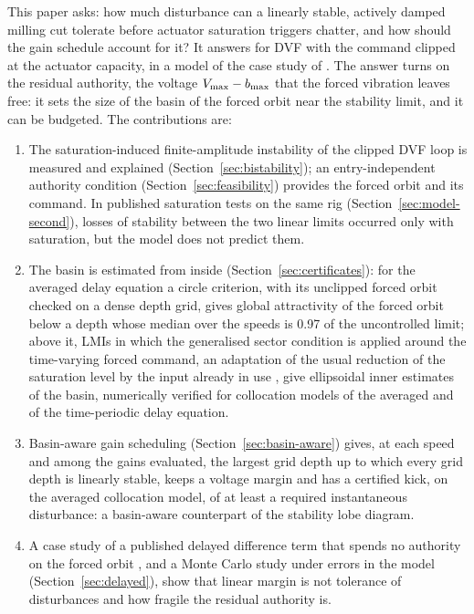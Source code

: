 This paper asks: how much disturbance can a linearly stable, actively damped milling cut tolerate before actuator saturation triggers chatter, and how should the gain schedule account for it? It answers for DVF with the command clipped at the actuator capacity, in a model of the case study of \citet{ozsoy2026robust}. The answer turns on the residual authority, the voltage $V_{\max}-b_{\max}$ that the forced vibration leaves free: it sets the size of the basin of the forced orbit near the stability limit, and it can be budgeted. The contributions are:
\begin{enumerate}
\item The saturation-induced finite-amplitude instability of the clipped DVF loop is measured and explained (Section~\ref{sec:bistability}); an entry-independent authority condition (Section~\ref{sec:feasibility}) provides the forced orbit and its command. In published saturation tests on the same rig (Section~\ref{sec:model-second}), losses of stability between the two linear limits occurred only with saturation, but the model does not predict them.
\item The basin is estimated from inside (Section~\ref{sec:certificates}): for the averaged delay equation a circle criterion, with its unclipped forced orbit checked on a dense depth grid, gives global attractivity of the forced orbit below a depth whose median over the speeds is 0.97 of the uncontrolled limit; above it, LMIs in which the generalised sector condition is applied around the time-varying forced command, an adaptation of the usual reduction of the saturation level by the input already in use \citep{hu2001book,tarbouriech2011book}, give ellipsoidal inner estimates of the basin, numerically verified for collocation models of the averaged and of the time-periodic delay equation.
\item Basin-aware gain scheduling (Section~\ref{sec:basin-aware}) gives, at each speed and among the gains evaluated, the largest grid depth up to which every grid depth is linearly stable, keeps a voltage margin and has a certified kick, on the averaged collocation model, of at least a required instantaneous disturbance: a basin-aware counterpart of the stability lobe diagram.
\item A case study of a published delayed difference term that spends no authority on the forced orbit \citep{pyragas1992continuous,li2022ijamt}, and a Monte Carlo study under errors in the model (Section~\ref{sec:delayed}), show that linear margin is not tolerance of disturbances and how fragile the residual authority is.
\end{enumerate}
